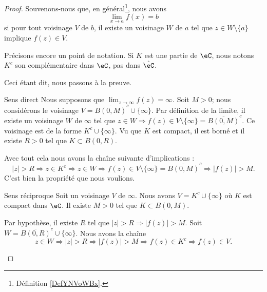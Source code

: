\begin{proof}
    Souvenons-nous que, en général\footnote{Définition \ref{DefYNVoWBx}.}, nous avons
    \begin{equation}
        \lim_{x\to a} f(x)=b
    \end{equation}
    si pour tout voisinage \( V\) de \( b\), il existe un voisinage \( W\) de \( a\) tel que \( z\in W\setminus\{ a \}\) implique \( f(z)\in V\).

    Précisons encore un point de notation. Si \( K\) est une partie de \( \eC\), nous notons \( K^c\) son complémentaire dans \( \eC\), pas dans \( \hat  \eC\).

    Ceci étant dit, nous passons à la preuve.
    \begin{subproof}
        \item[Sens direct]
            Nous supposons que \( \lim_{z\to \infty} f(z)=\infty\). Soit \( M>0\); nous considérons le voisinage \( V=\overline{ B(0,M) }^c\cup\{ \infty \}\). Par définition de la limite, il existe un voisinage \( W\) de \( \infty\) tel que \( z\in W\Rightarrow f(z)\in V\setminus\{ \infty \}=\overline{ B(0,M) }^c\). Ce voisinage est de la forme \( K^c\cup\{ \infty \}\). Vu que \( K\) est compact, il est borné et il existe \( R>0\) tel que \( K\subset B(0,R)\).

            Avec tout cela nous avons la chaîne suivante d'implications :
            \begin{equation}
                | z |>R\Rightarrow z\in K^c\Rightarrow z\in W\Rightarrow f(z)\in V\setminus\{ \infty \}=\overline{ B(0,M) }^c\Rightarrow | f(z) |>M.
            \end{equation}
            C'est bien la propriété que nous voulions.
        \item[Sens réciproque]
            Soit un voisinage \( V\) de \( \infty\). Nous avons \( V=K^c\cup\{ \infty \}\) où \( K\) est compact dans \( \eC\). Il existe \( M>0\) tel que \( K\subset B(0,M)\).

            Par hypothèse, il existe \( R\) tel que \( | z |>R\Rightarrow | f(z) |>M\). Soit \( W=\overline{ B(0,R) }^c\cup\{ \infty \}\). Nous avons la chaîne
            \begin{equation}
                z\in W\Rightarrow| z |>R\Rightarrow| f(z) |>M\Rightarrow f(z)\in K^c\Rightarrow f(z)\in V.
            \end{equation}
    \end{subproof}
\end{proof}

